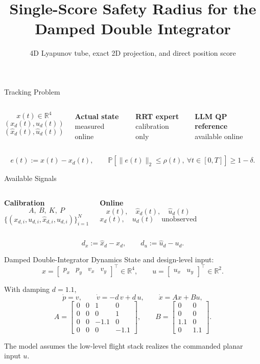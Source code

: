 \documentclass[aspectratio=43,11pt]{beamer}
\title[Single-Score Radius: Double Integrator]{Single-Score Safety Radius for the Damped Double Integrator}
\subtitle{4D Lyapunov tube, exact 2D projection, and direct position score}
\author{}
\date{}
\newcommand{\xd}{x_d}
\newcommand{\xh}{\hat{x}_d}
\newcommand{\ud}{u_d}
\newcommand{\uh}{\hat{u}_d}
\begin{document}
\begin{frame}
  \titlepage
\end{frame}

\begin{frame}{Tracking Problem}
\begin{columns}[T]
\[
x(t)\in\mathbb R^4
\]
\[
(\xd(t),\ud(t))
\]
\[
(\xh(t),\uh(t))
\]

\textbf{Actual state}\\[-0.2em]
measured online

\vspace{0.6em}
\textbf{RRT expert}\\[-0.2em]
calibration only

\vspace{0.6em}
\textbf{LLM QP reference}\\[-0.2em]
available online
\end{columns}

\vspace{0.7em}
\[
e(t):=x(t)-\xd(t),
\qquad
\mathbb P\!\left[\|e(t)\|_2\leq\rho(t),\ \forall t\in[0,T]\right]\geq1-\delta.
\]
\end{frame}

\begin{frame}{Available Signals}
\begin{columns}[T]
\textbf{Calibration}
\[
A,\ B,\ K,\ P
\]
\[
\big\{(x_{d,i},u_{d,i},\hat{x}_{d,i},\hat{u}_{d,i})\big\}_{i=1}^{N}
\]

\textbf{Online}
\[
x(t),\quad \xh(t),\quad \uh(t)
\]
\[
\xd(t),\quad \ud(t)\quad\text{unobserved}
\]
\end{columns}

\vspace{0.7em}
\[
d_x:=\xh-\xd,
\qquad
d_u:=\uh-\ud.
\]
\end{frame}

\begin{frame}{Damped Double-Integrator Dynamics}
State and design-level input:
\[
x=\begin{bmatrix}p_x&p_y&v_x&v_y\end{bmatrix}^{\!\top}\in\mathbb R^4,
\qquad
u=\begin{bmatrix}u_x&u_y\end{bmatrix}^{\!\top}\in\mathbb R^2.
\]

With damping $d=1.1$,
\[
\dot p=v,\qquad \dot v=-d\,v+d\,u,
\qquad \dot x=Ax+Bu,
\]
\[
A=\begin{bmatrix}
0&0&1&0\\
0&0&0&1\\
0&0&-1.1&0\\
0&0&0&-1.1
\end{bmatrix},
\qquad
B=\begin{bmatrix}
0&0\\0&0\\1.1&0\\0&1.1
\end{bmatrix}.
\]

The model assumes the low-level flight stack realizes the commanded planar input $u$.
\end{frame}
\end{document}
